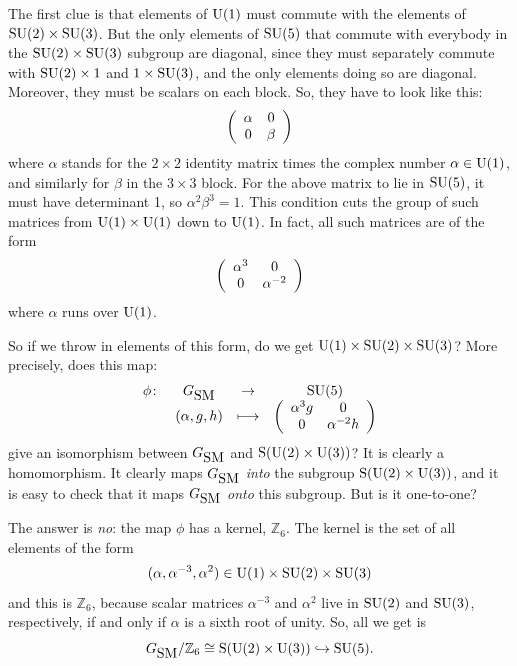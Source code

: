 \documentclass{article}
\newcommand{\maps}{\colon}    %
\newcommand{\Z}{{\mathbb Z}}  %
\newcommand{\U}{{\rm U}}    %
\renewcommand{\S}{{\rm S}}    %
\newcommand{\SU}{{\rm SU}}    %
\newcommand{\inclusion}{\hookrightarrow}
\newcommand{\GSM}{{G_{\mbox{\rm SM}}}}  %
\begin{document}
The first clue is that elements of $\U(1)$ must commute with the
elements of $\SU(2) \times \SU(3)$.  But the only elements of $\SU(5)$
that commute with everybody in the $\SU(2) \times \SU(3)$ subgroup are
diagonal, since they must separately commute with $\SU(2) \times 1$
and $1 \times \SU(3)$, and the only elements doing so are
diagonal. Moreover, they must be scalars on each block.  So, they have
to look like this:
\[
\left( 
\begin{array}{c c}
\alpha & 0 \\
0      & \beta
\end{array}
\right)
\]
where $\alpha$ stands for the $2 \times 2$ identity matrix times
the complex number $\alpha \in \U(1)$, and similarly for $\beta$ in the
$3 \times 3$ block.  For the above matrix to lie in $\SU(5)$, it
must have determinant 1, so $\alpha^2 \beta^3 = 1$.  This condition 
cuts the group of such matrices from $\U(1) \times \U(1)$ down to 
$\U(1)$. In fact, all such matrices are of the form
\[
\left( 
\begin{array}{c c}
\alpha^3 & 0 \\
0        & \alpha^{-2}
\end{array}
\right)
\]
where $\alpha$ runs over $\U(1)$.

So if we throw in elements of this form, do we get $\U(1) \times
\SU(2) \times \SU(3)$?  More precisely, does this map:
\[ \begin{array}{rccc}
  \phi \maps & \GSM &\to& \SU(5) \\   
             & (\alpha, g, h) &\longmapsto& 
\left( 
\begin{array}{c c}
\alpha^{3}g & 0 \\
0           & \alpha^{-2}h
\end{array}
\right)
\end{array}
\]
give an isomorphism between $\GSM$ and $\S(\U(2) \times \U(3))$?
It is clearly a homomorphism.  It clearly maps 
$\GSM$ \emph{into} the subgroup $\S(\U(2) \times \U(3))$, and 
it is easy to check that it maps $\GSM$ \emph{onto} this subgroup.
But is it one-to-one?

The answer is \emph{no}: the map $\phi$ has a kernel, $\Z_6$.  
The kernel is the set of all elements of the form
\[ (\alpha, \alpha^{-3}, \alpha^2) \in \U(1) \times \SU(2) \times \SU(3) \]
and this is $\Z_6$, because scalar matrices $\alpha^{-3}$ and $\alpha^2$ live
in $\SU(2)$ and $\SU(3)$, respectively, if and only if $\alpha$ is a sixth root
of unity.  So, all we get is
\[  \GSM/\Z_6 \cong \S(\U(2) \times \U(3)) \inclusion \SU(5). \]
\end{document}

